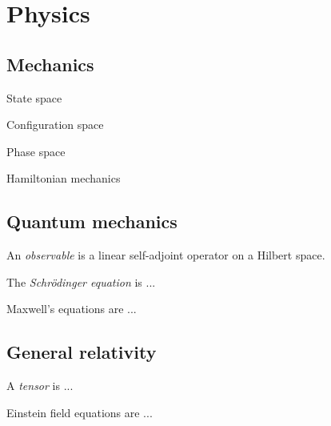 \chapter{Physics}

\section{Mechanics}

State space

Configuration space

Phase space

Hamiltonian mechanics

\section{Quantum mechanics}

%
An \emph{observable} is a linear self-adjoint operator on a Hilbert space.

%
The \emph{Schr\"odinger equation} is ...

%
Maxwell's equations are ...

\section{General relativity}

%
A \emph{tensor} is ...

%
Einstein field equations are ...
